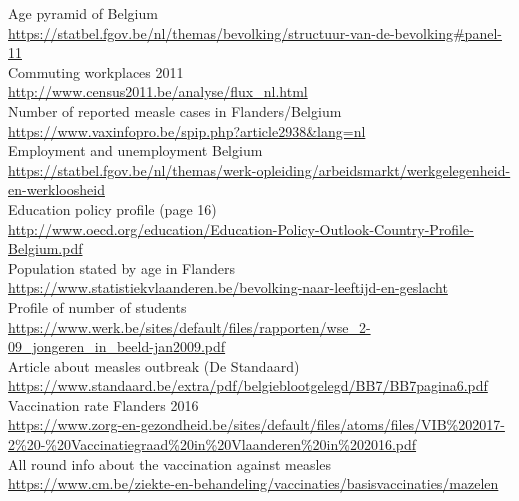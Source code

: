 \documentclass[runningheads]{llncs}
\begin{document}
\begin{thebibliography}{20}
		Age pyramid of Belgium \\
		\url{https://statbel.fgov.be/nl/themas/bevolking/structuur-van-de-bevolking\#panel-11}
		\\
		
		Commuting workplaces 2011 \\
		\url{http://www.census2011.be/analyse/flux\_nl.html}
		\\
		
		Number of reported measle cases in Flanders/Belgium \\
		\url{https://www.vaxinfopro.be/spip.php?article2938\&lang=nl}
		\\
		
		Employment and unemployment Belgium \\
		\url{https://statbel.fgov.be/nl/themas/werk-opleiding/arbeidsmarkt/werkgelegenheid-en-werkloosheid}
		\\
		
		Education policy profile (page 16) \\
		\url{http://www.oecd.org/education/Education-Policy-Outlook-Country-Profile-Belgium.pdf}
		\\
		
		Population stated by age in Flanders \\
		\url{https://www.statistiekvlaanderen.be/bevolking-naar-leeftijd-en-geslacht}
		\\
		
		Profile of number of students \\
		\url{https://www.werk.be/sites/default/files/rapporten/wse\_2-09\_jongeren\_in\_beeld-jan2009.pdf}
		\\
		
		Article about measles outbreak (De Standaard) \\
		\url{https://www.standaard.be/extra/pdf/belgieblootgelegd/BB7/BB7pagina6.pdf}
		\\
		
		Vaccination rate Flanders 2016 \\
		\url{https://www.zorg-en-gezondheid.be/sites/default/files/atoms/files/VIB\%202017-2\%20-\%20Vaccinatiegraad\%20in\%20Vlaanderen\%20in\%202016.pdf}
		\\
		
		All round info about the vaccination against measles \\
		\url{https://www.cm.be/ziekte-en-behandeling/vaccinaties/basisvaccinaties/mazelen}
		
	\end{thebibliography}
	
\end{document}
